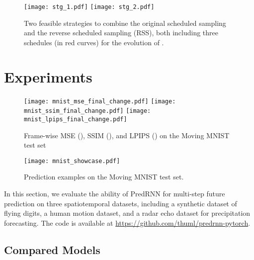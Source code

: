 \documentclass[10pt,journal,compsoc]{IEEEtran}
\let\MYoriglatexcaption\caption
\renewcommand{\caption}[2][\relax]{\MYoriglatexcaption[#2]{#2}}
\begin{document}
\begin{figure}[t]
\centering
{
\texttt{[image: stg\_1.pdf]}
\label{fig:Strategy_1}
}
\hfil
{
\texttt{[image: stg\_2.pdf]}
\label{fig:Strategy_2}
}
\caption{Two feasible strategies to combine the original scheduled sampling and the reverse scheduled sampling (RSS), both including three schedules (in red curves) for the evolution of .}
\label{fig:rss_schemes}
\vspace{-5pt}
\end{figure}




\section{Experiments}


\begin{figure*}[t]
\centering
{
    \texttt{[image: mnist\_mse\_final\_change.pdf]}
    }
    \hfil
{
    \texttt{[image: mnist\_ssim\_final\_change.pdf]}
    }
    \hfil
{
    \texttt{[image: mnist\_lpips\_final\_change.pdf]}
    }
\caption{Frame-wise MSE (), SSIM (), and LPIPS () on the Moving MNIST test set}
\label{fig:mnist_frame}
\end{figure*}


\begin{figure*}[t]
  \centering
  \texttt{[image: mnist\_showcase.pdf]}
  \caption{Prediction examples on the Moving MNIST test set.}
  \label{fig:mnist_result}
\end{figure*}

In this section, we evaluate the ability of PredRNN for multi-step future prediction on three spatiotemporal datasets, including a synthetic dataset of flying digits, a human motion dataset, and a radar echo dataset for precipitation forecasting. 
The code is available at \url{https://github.com/thuml/predrnn-pytorch}.



\subsection{Compared Models} 
\end{document}
